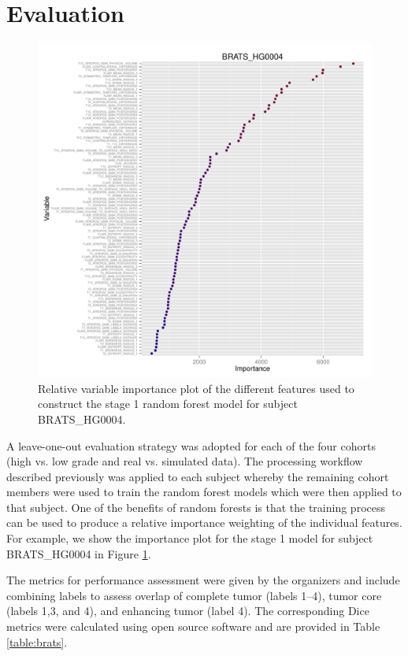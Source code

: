 \documentclass{llncs}
\begin{document}
\section{Evaluation}

\begin{figure}
  \centerline{
  \includegraphics[width=150mm]{Figures/BRATS_HG0004GMM.pdf}
  }
  \caption{Relative variable importance plot of the different features used to construct the stage 1 random forest model for subject BRATS\_HG0004.}
  \label{fig:importance}
\end{figure}

A leave-one-out evaluation strategy was adopted for each of the four cohorts (high vs. low grade and real vs. simulated data).  The processing workflow described previously was applied to each subject whereby the remaining cohort members were used to train the random forest models which were then applied to that subject.  One of the benefits of random forests is that the training process can be used to produce a relative importance weighting of the individual features.  For example, we show the importance plot for the stage 1 model for subject BRATS\_HG0004 in Figure \ref{fig:importance}.  

The metrics for performance assessment were given by the organizers and include 
combining labels to assess overlap of complete tumor (labels 1--4), tumor core (labels 1,3, and 4), and enhancing tumor (label 4).  The corresponding Dice metrics were calculated using open source software \cite{tustison2009} and are provided in Table \ref{table:brats}.
\end{document}
